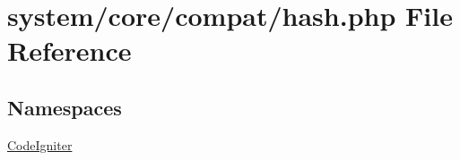 \hypertarget{hash_8php}{}\section{system/core/compat/hash.php File Reference}
\label{hash_8php}
\subsection*{Namespaces}
\begin{DoxyCompactItemize}
\item 
 \mbox{\hyperlink{namespace_code_igniter}{Code\+Igniter}}
\end{DoxyCompactItemize}
